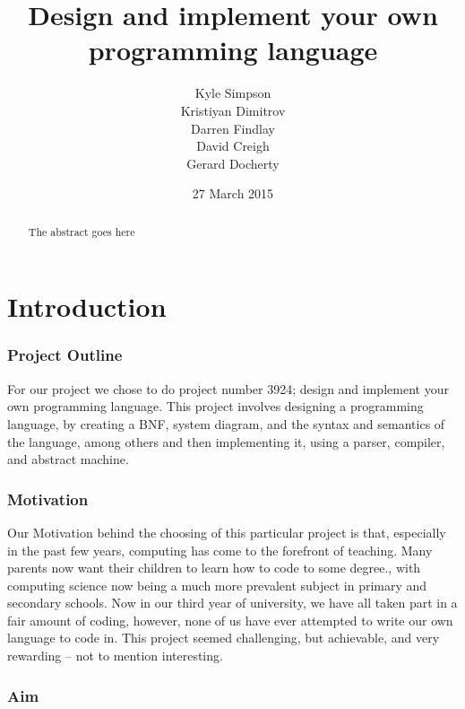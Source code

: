 \documentclass{l3proj}
\begin{document}
\title{Design and implement your own programming language}
\author{Kyle Simpson\\
		Kristiyan Dimitrov\\
        Darren Findlay\\
        David Creigh\\
		Gerard Docherty}
\date{27 March 2015}
\maketitle
\begin{abstract}

The abstract goes here

\end{abstract}
\educationalconsent
\tableofcontents
\chapter{Introduction}
\label{intro}

\subsection{Project Outline}

For our project we chose to do project number 3924; design and implement your own programming language. This project involves designing a programming language, by creating a BNF, system diagram, and the syntax and semantics of the language, among others and then implementing it, using a parser, compiler, and abstract machine.

\subsection{Motivation}

Our Motivation behind the choosing of this particular project is that, especially in the past few years, computing has come to the forefront of teaching. Many parents now want their children to learn how to code to some degree., with computing science now being a much more prevalent subject in primary and secondary schools. Now in our third year of university, we have all taken part in a fair amount of coding, however, none of us have ever attempted to write our own language to code in. This project seemed challenging, but achievable, and very rewarding – not to mention interesting.

\subsection{Aim}
\end{document}

